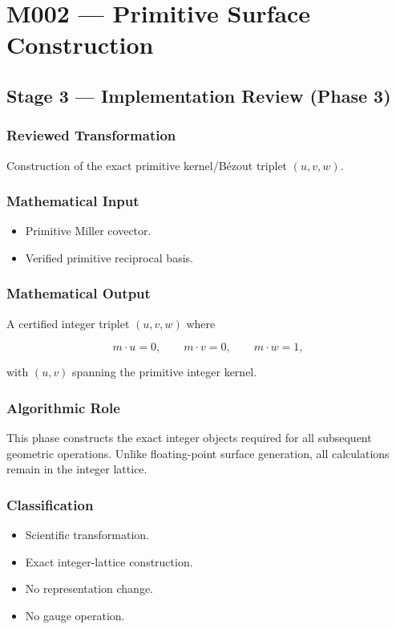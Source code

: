 
\chapter{M002 --- Primitive Surface Construction}

\section{Stage 3 --- Implementation Review (Phase 3)}

\subsection{Reviewed Transformation}

Construction of the exact primitive kernel/B\'ezout triplet
$(u,v,w)$.

\subsection{Mathematical Input}

\begin{itemize}
\item Primitive Miller covector.
\item Verified primitive reciprocal basis.
\end{itemize}

\subsection{Mathematical Output}

A certified integer triplet $(u,v,w)$ where

\[
m\cdot u = 0,\qquad
m\cdot v = 0,\qquad
m\cdot w = 1,
\]

with $(u,v)$ spanning the primitive integer kernel.

\subsection{Algorithmic Role}

This phase constructs the exact integer objects required for all
subsequent geometric operations. Unlike floating-point surface
generation, all calculations remain in the integer lattice.

\subsection{Classification}

\begin{itemize}
\item Scientific transformation.
\item Exact integer-lattice construction.
\item No representation change.
\item No gauge operation.
\end{itemize}

